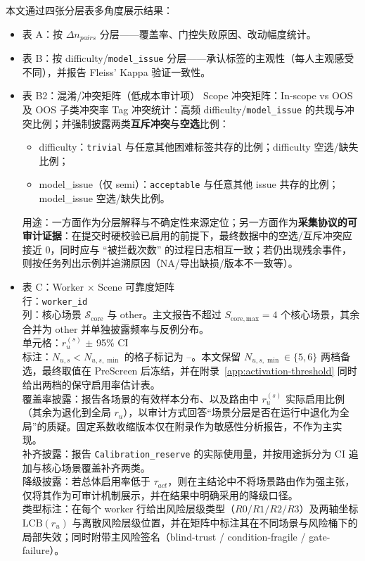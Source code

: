 本文通过四张分层表多角度展示结果：
\begin{itemize}
    \item 表 A：按 $\Delta n_{pairs}$ 分层——覆盖率、门控失败原因、改动幅度统计。
    \item 表 B：按 difficulty/\texttt{model\_issue} 分层——承认标签的主观性（每人主观感受不同），并报告 Fleiss' Kappa 验证一致性。
    \item 表 B2：混淆/冲突矩阵（低成本审计项）
Scope 冲突矩阵：In-scope vs OOS 及 OOS 子类冲突率
Tag 冲突统计：高频 difficulty/\texttt{model\_issue} 的共现与冲突比例；并强制披露两类\textbf{互斥冲突}与\textbf{空选}比例：
\begin{itemize}
    \item difficulty：\texttt{trivial} 与任意其他困难标签共存的比例；difficulty 空选/缺失比例；
    \item model\_issue（仅 semi）：\texttt{acceptable} 与任意其他 issue 共存的比例；model\_issue 空选/缺失比例。
\end{itemize}
用途：一方面作为分层解释与不确定性来源定位；另一方面作为\textbf{采集协议的可审计证据}：在提交时硬校验已启用的前提下，最终数据中的空选/互斥冲突应接近 0，同时应与 ``被拦截次数'' 的过程日志相互一致；若仍出现残余事件，则按任务列出示例并追溯原因（NA/导出缺损/版本不一致等）。
    \item 
表 C：Worker $\times$ Scene 可靠度矩阵
\\ 行：\texttt{worker\_id}
\\ 列：核心场景 $\mathcal{S}_{\mathrm{core}}$ 与 other。主文报告不超过 $S_{\mathrm{core,max}}=4$ 个核心场景，其余合并为 other 并单独披露频率与反例分布。
\\ 单元格：$r_{u}^{(s)}$ $\pm$ 95\% CI
\\ 标注：$N_{u,s}<N_{u,s,\min}$ 的格子标记为 --。本文保留 $N_{u,s,\min}\in\{5,6\}$ 两档备选，最终取值在 PreScreen 后冻结，并在附录~\ref{app:activation-threshold} 同时给出两档的保守启用率估计表。
\\ 覆盖率披露：报告各场景的有效样本分布、以及路由中 $r_u^{(s)}$ 实际启用比例（其余为退化到全局 $r_u$），以审计方式回答“场景分层是否在运行中退化为全局”的质疑。固定系数收缩版本仅在附录作为敏感性分析报告，不作为主实现。
\\ 补齐披露：报告 \texttt{Calibration\_reserve} 的实际使用量，并按用途拆分为 CI 追加与核心场景覆盖补齐两类。
\\ 降级披露：若总体启用率低于 $\tau_{act}$，则在主结论中不将场景路由作为强主张，仅将其作为可审计机制展示，并在结果中明确采用的降级口径。
\\ 类型标注：在每个 worker 行给出风险层级类型（$R0/R1/R2/R3$）及两轴坐标 $\mathrm{LCB}(r_u)$ 与离散风险层级位置，并在矩阵中标注其在不同场景与风险桶下的局部失效；同时附带主风险签名（blind-trust / condition-fragile / gate-failure）。

\end{itemize}
